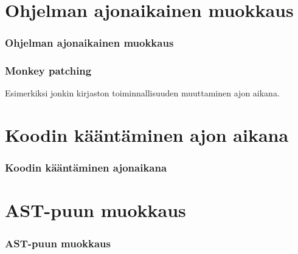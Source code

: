 \documentclass{beamer}
\begin{document}
\section{Ohjelman ajonaikainen muokkaus}

\begin{frame}[fragile]
\frametitle{Ohjelman ajonaikainen muokkaus}
\end{frame}

\begin{frame}[fragile]
\frametitle{Monkey patching}
Esimerkiksi jonkin kirjaston toiminnallisuuden muuttaminen ajon aikana. 
\end{frame}

\section{Koodin kääntäminen ajon aikana}

\begin{frame}[fragile]
\frametitle{Koodin kääntäminen ajonaikana}
\end{frame}

\section{AST-puun muokkaus}

\begin{frame}[fragile]
\frametitle{AST-puun muokkaus}
\end{frame}
\end{document}
